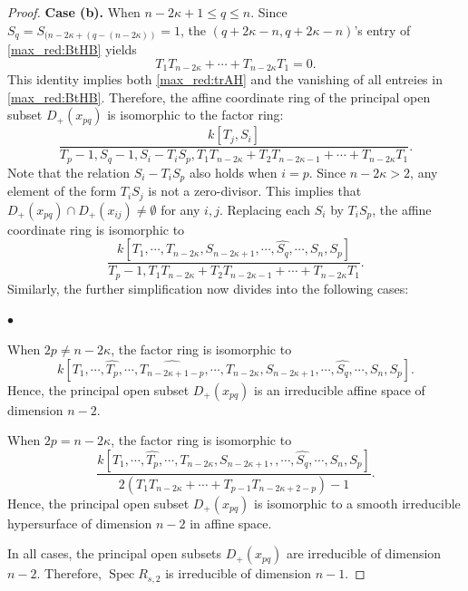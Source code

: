 \documentclass[pdflatex,sn-mathphys-num]{sn-jnl}%
\theoremstyle{thmstyleone}%
\theoremstyle{thmstyletwo}%
\numberwithin{equation}{subsection}
\theoremstyle{thmstylethree}%
\DeclareMathOperator{\Spec}{Spec}
\newcommand{\wh}{\widehat}
\newenvironment{altitemize}
	{\begin{list}
			{$\bullet$}
			{\setlength{\labelwidth}{0pt}
				\setlength{\itemindent}{5pt}
				\setlength{\labelsep}{5pt}
				\setlength{\leftmargin}{0pt}
				\setlength{\itemsep}{\the\smallskipamount}
		}}
		{\end{list}}
\begin{document}
\begin{proof}
				
\noindent\textbf{Case (b).} When $n-2\kappa+1\leq q\leq n$. Since $S_q=S_{(n-2\kappa+(q-(n-2\kappa))}=1$, the $(q+2\kappa-n,q+2\kappa-n)$'s entry of \eqref{max_red:BtHB} yields 
\begin{equation}\label{max_red:TTsum}
	T_1T_{n-2\kappa}+\cdots+T_{n-2\kappa}T_1=0.
\end{equation}
This identity implies both \eqref{max_red:trAH} and the vanishing of all entreies in \eqref{max_red:BtHB}. 
Therefore, the affine coordinate ring of the principal open subset $D_+(x_{pq})$ is isomorphic to the factor ring:
\begin{equation*}
	\frac{k[T_j,S_i]}{T_p-1,S_q-1, S_i-T_iS_p,T_1T_{n-2\kappa}+T_2T_{n-2\kappa-1}+\cdots+T_{n-2\kappa}T_1}.
\end{equation*}
Note that the relation $S_i-T_iS_p$ also holds when $i=p$.
Since $n-2\kappa>2$, any element of the form $T_iS_j$ is not a zero-divisor. This implies that $D_+(x_{pq})\cap D_+(x_{ij})\neq\emptyset$ for any $i,j$.
Replacing each $S_i$ by $T_iS_p$, the affine coordinate ring is isomorphic to
\begin{equation*}
	\frac{k[T_1,\cdots,T_{n-2\kappa},S_{n-2\kappa+1},\cdots,\wh{S_q},\cdots,S_n,S_p]}{T_p-1,T_1T_{n-2\kappa}+T_2T_{n-2\kappa-1}+\cdots+T_{n-2\kappa}T_1}.
\end{equation*}
Similarly, the further simplification now divides into the following cases:
\begin{altitemize}
	\item When $2p\neq n-2\kappa$, the factor ring is isomorphic to
	\begin{equation*}
		k[T_1,\cdots,\wh{T_p},\cdots,\wh{T_{n-2\kappa+1-p}},\cdots,T_{n-2\kappa},S_{n-2\kappa+1},\cdots,\wh{S_q},\cdots,S_n,S_p].
	\end{equation*}
	Hence, the principal open subset $D_+(x_{pq})$ is an irreducible affine space of dimension $n-2$.
					

	\item When $2p=n-2\kappa$, the factor ring is isomorphic to
	\begin{equation*}
		\frac{k[T_1,\cdots,\wh{T_p},\cdots,T_{n-2\kappa},S_{n-2\kappa+1},,\cdots,\wh{S_q},\cdots,S_n,S_p]}{2(T_1T_{n-2\kappa}+\cdots+T_{p-1}T_{n-2\kappa+2-p})-1}.
	\end{equation*}
	Hence, the principal open subset $D_+(x_{pq})$ is isomorphic to a smooth irreducible hypersurface of dimension $n-2$ in affine space.
\end{altitemize}
In all cases, the principal open subsets $D_+(x_{pq})$ are irreducible of dimension $n-2$. Therefore, $\Spec R_{s,2}$ is irreducible of dimension $n-1$.


\end{proof}
\end{document}
